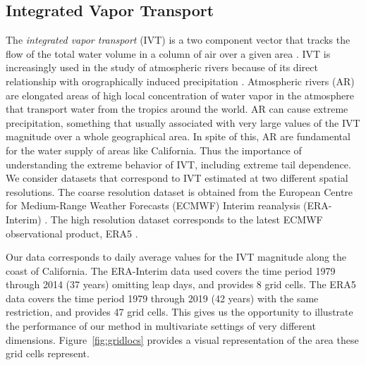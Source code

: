 \subsection{Integrated Vapor Transport\label{subsec:ivt}}
The \emph{integrated vapor transport} (IVT) is a two component vector 
that tracks the flow of the total water volume in a column of air 
over a given area \citep{ralph2017}.  IVT is increasingly used in the study of atmospheric rivers because of its direct 
relationship with orographically induced precipitation
\citep{neiman2009water}. Atmospheric rivers (AR) are elongated areas of high 
local concentration of water vapor in the atmosphere that transport water
from the tropics around the world. AR can cause extreme 
precipitation,  something that usually associated with very large values
of the IVT magnitude over a whole geographical area. In spite of this, AR
are fundamental for the water supply of areas like California. Thus the
importance of understanding the extreme behavior of IVT, including 
extreme tail dependence. We consider datasets that correspond to IVT
estimated at two different spatial resolutions. The coarse resolution dataset
is obtained from the European Centre for Medium-Range Weather Forecasts
(ECMWF) Interim reanalysis (ERA-Interim) \citep{berrisford2011atmospheric,dee2011era}. 
The high resolution dataset corresponds to the latest ECMWF 
observational product, ERA5  \citep{hersbach2020era5}. 

Our data corresponds to daily average values for the IVT magnitude
along the coast of California.  The ERA-Interim data used covers the time period 
1979 through 2014 (37 years) omitting leap days, and provides 8 grid cells.  The ERA5 data
covers the time period 1979 through 2019 (42 years) with the same restriction, and provides 
47 grid cells.  This gives us the opportunity to illustrate the performance of our method 
in multivariate settings of very different dimensions. Figure~\ref{fig:gridlocs} provides a visual representation of the area these grid cells represent.

